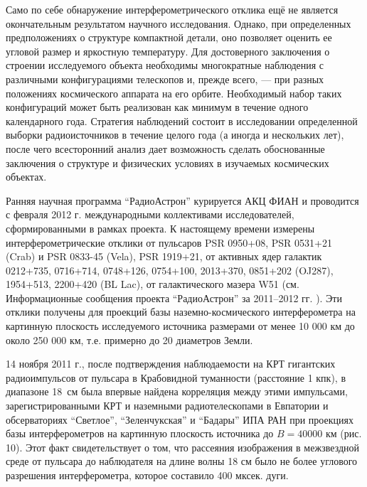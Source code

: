 Само по себе обнаружение интерферометрического отклика ещё не является
окончательным результатом научного исследования.
Однако, при определенных предположениях о структуре компактной детали,
оно позволяет оценить ее угловой размер и яркостную температуру.
Для достоверного заключения о строении
исследуемого объекта необходимы многократные наблюдения с различными
конфигурациями телескопов и, прежде всего, --- при разных положениях
космического аппарата на его орбите. Необходимый набор таких конфигураций
может быть реализован как минимум в течение одного календарного года.
Стратегия наблюдений состоит в исследовании определенной выборки радиоисточников
в течение целого года (а иногда и нескольких лет), после чего
всесторонний анализ дает возможность сделать обоснованные заключения о
структуре и физических условиях в изучаемых космических объектах.

Ранняя научная программа ``РадиоАстрон'' курируется АКЦ ФИАН и проводится с
февраля 2012 г. международными коллективами исследователей, сформированными
в рамках проекта.
К настоящему времени
измерены интерферометрические отклики от пульсаров PSR 0950+08,
PSR 0531+21 (Crab) и PSR 0833-45 (Vela), PSR 1919+21, от активных ядер
галактик 0212+735, 0716+714, 0748+126, 0754+100, 2013+370, 0851+202
(OJ287), 1954+513, 2200+420 (BL Lac), от галактического мазера
W51 (см. Информационные сообщения проекта ``РадиоАстрон'' за 2011--2012 гг.
\cite{}).
Эти отклики получены для проекций базы наземно-космического
интерферометра на картинную плоскость исследуемого источника размерами
от менее 10 000 км до около 250 000 км, т.е. примерно до
20 диаметров Земли.

14 ноября 2011 г., после подтверждения наблюдаемости на КРТ гигантских
радиоимпульсов от пульсара в Крабовидной туманности (расстояние 1 кпк),
в диапазоне 18~см была впервые найдена корреляция между этими импульсами,
зарегистрированными КРТ и наземными радиотелескопами в Евпатории и
обсерваториях ``Светлое'', ``Зеленчукская'' и ``Бадары'' ИПА РАН при
проекциях базы интерферометров на картинную плоскость источника
до $B = 40 000$ км (рис. 10).
 Этот факт свидетельствует о том, что
рассеяния изображения в межзвездной среде от пульсара до наблюдателя
на длине волны 18 см было не более углового разрешения интерферометра,
которое составило 400 мксек. дуги.


